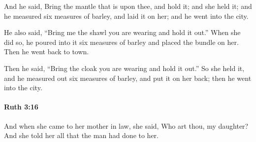 			\begin{versebox}
					\item[BHS] 
					\item[LXX] 
					\item[ASV] And he said, Bring the mantle that is upon thee, and hold it; and she held it; and he measured six measures of barley, and laid it on her; and he went into the city.
					\item[NIV] He also said, “Bring me the shawl you are wearing and hold it out.” When she did so, he poured into it six measures of barley and placed the bundle on her. Then he went back to town.
					\item[NRSV] Then he said, “Bring the cloak you are wearing and hold it out.” So she held it, and he measured out six measures of barley, and put it on her back; then he went into the city.
			\end{versebox}

		\paragraph{Ruth 3:16} %
			\label{RUTH-3-16}

			And when she came to her mother in law, she said, Who art thou, my daughter? And she told her all that the man had done to her.

